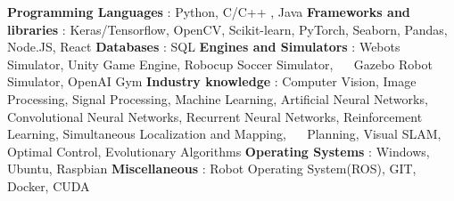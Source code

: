 \begin{cventries}  
\skillentry
    {
    \bullet \space \textbf{Programming Languages} : Python, C/C++
    , Java \newline
    \bullet \space \textbf{Frameworks and libraries} : Keras/Tensorflow, OpenCV, Scikit-learn, PyTorch, Seaborn, Pandas, Node.JS, React \newline
    \bullet \space \textbf{Databases} : SQL \newline
    \bullet \space \textbf{Engines and Simulators} : Webots Simulator, Unity Game Engine, Robocup Soccer Simulator, \newline $\quad$ Gazebo Robot Simulator, OpenAI Gym \newline
    \bullet \space \textbf{Industry knowledge} : Computer Vision, Image Processing, Signal Processing, Machine Learning, Artificial Neural Networks, \newline $\quad$ Convolutional Neural Networks, Recurrent Neural Networks, Reinforcement Learning, Simultaneous Localization and Mapping, \newline $\quad$ Planning, Visual SLAM, Optimal Control, Evolutionary Algorithms   \newline
    \bullet \space \textbf{Operating Systems} : Windows, Ubuntu, Raspbian \newline
    \bullet \space \textbf{Miscellaneous} : Robot Operating System(ROS), GIT, Docker, CUDA
    }
\end{cventries}
